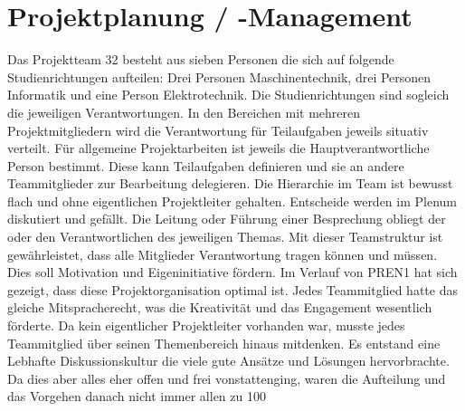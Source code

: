 \section{Projektplanung / -Management}

Das Projektteam 32 besteht aus sieben Personen die sich auf folgende Studienrichtungen aufteilen: Drei Personen Maschinentechnik, drei Personen Informatik und eine Person Elektrotechnik. Die Studienrichtungen sind sogleich die jeweiligen Verantwortungen. In den Bereichen mit mehreren Projektmitgliedern wird die Verantwortung für Teilaufgaben jeweils situativ verteilt. Für allgemeine Projektarbeiten ist jeweils die Hauptverantwortliche Person bestimmt. Diese kann Teilaufgaben definieren und sie an andere Teammitglieder zur Bearbeitung delegieren. Die Hierarchie im Team ist bewusst flach und ohne eigentlichen Projektleiter gehalten. Entscheide werden im Plenum diskutiert und gefällt. Die Leitung oder Führung einer Besprechung obliegt der oder den Verantwortlichen des jeweiligen Themas. Mit dieser Teamstruktur ist gewährleistet, dass alle Mitglieder Verantwortung tragen können und müssen. Dies soll Motivation und Eigeninitiative fördern. Im Verlauf von PREN1 hat sich gezeigt, dass diese Projektorganisation optimal ist. Jedes Teammitglied hatte das gleiche Mitspracherecht, was die Kreativität und das Engagement wesentlich förderte. Da kein eigentlicher Projektleiter vorhanden war, musste jedes Teammitglied über seinen Themenbereich hinaus mitdenken. Es entstand eine Lebhafte Diskussionskultur die viele gute Ansätze und Lösungen hervorbrachte. Da dies aber alles eher offen und frei vonstattenging, waren die Aufteilung und das Vorgehen danach nicht immer allen zu 100%
